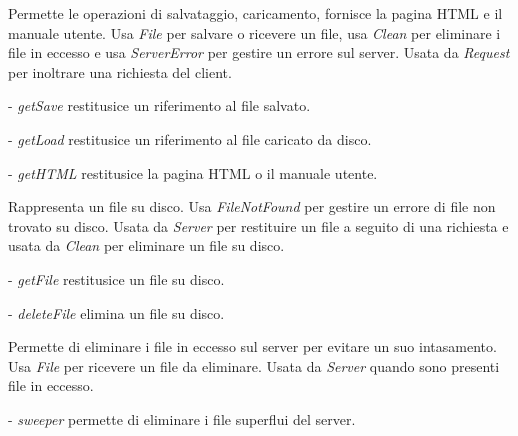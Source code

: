 Permette le operazioni di salvataggio, caricamento, fornisce la pagina HTML e il manuale utente.
Usa \textit{File} per salvare o ricevere un file, usa \textit{Clean} per eliminare i file in eccesso e usa \textit{ServerError} per gestire un errore sul server.
Usata da \textit{Request} per inoltrare una richiesta del client.
\begin{elencopuntato}[\normindent]
\item[-] \textit{getSave} restitusice un riferimento al file salvato.
\item[-] \textit{getLoad} restitusice un riferimento al file caricato da disco.
\item[-] \textit{getHTML} restitusice la pagina HTML o il manuale utente.
\end{elencopuntato}

Rappresenta un file su disco.
Usa \textit{FileNotFound} per gestire un errore di file non trovato su disco.
Usata da \textit{Server} per restituire un file a seguito di una richiesta e usata da \textit{Clean} per eliminare un file su disco.
\begin{elencopuntato}[\normindent]
\item[-] \textit{getFile} restitusice un file su disco.
\item[-] \textit{deleteFile} elimina un file su disco.
\end{elencopuntato}

Permette di eliminare i file in eccesso sul server per evitare un suo intasamento.
Usa \textit{File} per ricevere un file da eliminare.
Usata da \textit{Server} quando sono presenti file in eccesso.
\begin{elencopuntato}[\normindent]
\item[-] \textit{sweeper} permette di eliminare i file superflui del server.
\end{elencopuntato}

